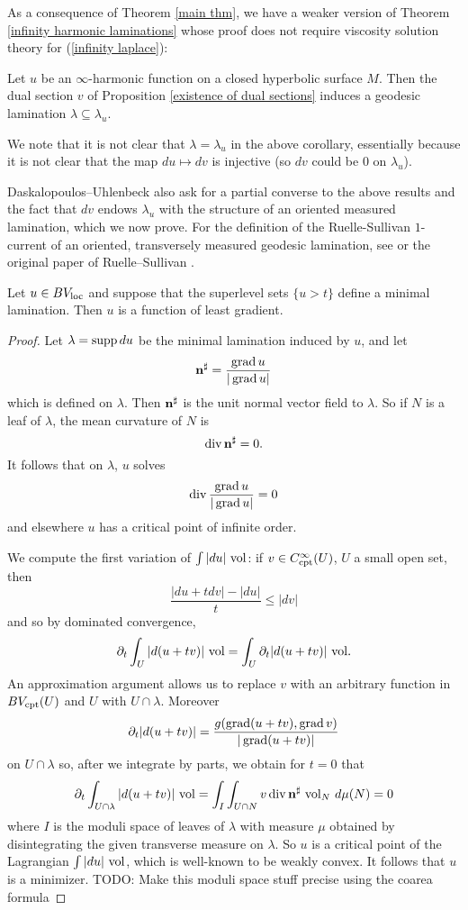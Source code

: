 As a consequence of Theorem \ref{main thm}, we have a weaker version of Theorem \ref{infinity harmonic laminations} whose proof does not require viscosity solution theory for (\ref{infinity laplace}):

\begin{corollary}
Let $u$ be an $\infty$-harmonic function on a closed hyperbolic surface $M$.
Then the dual section $v$ of Proposition \ref{existence of dual sections} induces a geodesic lamination $\lambda \subseteq \lambda_u$.
\end{corollary}

We note that it is not clear that $\lambda = \lambda_u$ in the above corollary, essentially because it is not clear that the map $du \mapsto dv$ is injective (so $dv$ could be $0$ on $\lambda_u$).

Daskalopoulos--Uhlenbeck also ask for a partial converse to the above results and the fact that $dv$ endows $\lambda_u$ with the structure of an oriented measured lamination, which we now prove. For the definition of the Ruelle-Sullivan $1$-current of an oriented, transversely measured geodesic lamination, see \cite[\S8]{daskalopoulos2020transverse} or the original paper of Ruelle--Sullivan \cite{Ruelle75}.

\begin{proposition}\label{minimal bounding implies least gradient}
Let $u \in BV_{\mathrm{loc}}$ and suppose that the superlevel sets $\{u > t\}$ define a minimal lamination.
Then $u$ is a function of least gradient.
\end{proposition}
\begin{proof}
Let $\lambda = \operatorname{supp} du$ be the minimal lamination induced by $u$, and let
$$\mathbf n^\sharp = \frac{\operatorname{grad} u}{|\operatorname{grad} u|}$$
which is defined on $\lambda$. Then $\mathbf n^\sharp$ is the unit normal vector field to $\lambda$.
So if $N$ is a leaf of $\lambda$, the mean curvature of $N$ is
$$\operatorname{div} \mathbf n^\sharp = 0.$$
It follows that on $\lambda$, $u$ solves
$$\operatorname{div} \frac{\operatorname{grad} u}{|\operatorname{grad} u|} = 0$$
and elsewhere $u$ has a critical point of infinite order.

We compute the first variation of $\int |du| ~\mathrm{vol}$: if $v \in C^\infty_{\mathrm{cpt}}(U)$, $U$ a small open set, then
$$\frac{|du + tdv| - |du|}{t} \leq |dv|$$
and so by dominated convergence,
$$\partial_t \int_U |d(u + tv)| ~\mathrm{vol} = \int_U \partial_t |d(u + tv)| ~\mathrm{vol}.$$
An approximation argument allows us to replace $v$ with an arbitrary function in $BV_{\mathrm{cpt}}(U)$ and $U$ with $U \cap \lambda$.
Moreover
$$\partial_t |d(u + tv)| = \frac{g (\operatorname{grad} (u + tv), \operatorname{grad} v)}{|\operatorname{grad} (u + tv)|}$$
on $U \cap \lambda$ so, after we integrate by parts, we obtain for $t = 0$ that
$$\partial_t \int_{U \cap \lambda} |d(u + tv)| ~\mathrm{vol} = \int_I \int_{U \cap N} v\operatorname{div} \mathbf n^\sharp ~\mathrm{vol}_N ~d\mu(N) = 0$$
where $I$ is the moduli space of leaves of $\lambda$ with measure $\mu$ obtained by disintegrating the given transverse measure on $\lambda$.
So $u$ is a critical point of the Lagrangian $\int |du| ~\mathrm{vol}$, which is well-known to be weakly convex.
It follows that $u$ is a minimizer.
TODO: Make this moduli space stuff precise using the coarea formula
\end{proof}

